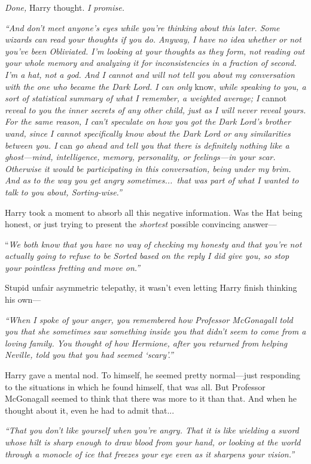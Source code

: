 \emph{Done,} Harry thought. \emph{I promise.}

\emph{“And don’t meet anyone’s eyes while you’re thinking about this later. Some wizards can read your thoughts if you do. Anyway, I have no idea whether or not you’ve been Obliviated. I’m looking at your thoughts as they form, not reading out your whole memory and analyzing it for inconsistencies in a fraction of second. I’m a hat, not a god. And I cannot and will not tell you about my conversation with the one who became the Dark Lord. I can only} know, \emph{while speaking to you, a sort of statistical summary of what I remember, a weighted average; I} cannot \emph{reveal to you the inner secrets of any other child, just as I will never reveal yours. For the same reason, I can’t speculate on how you got the Dark Lord’s brother wand, since I cannot specifically know about the Dark Lord or any similarities between you. I} can \emph{go ahead and tell you that there is definitely nothing like a ghost—mind, intelligence, memory, personality, or feelings—in your scar. Otherwise it would be participating in this conversation, being under my brim. And as to the way you get angry sometimes...\ that was part of what I wanted to talk to you about, Sorting-wise.”}

Harry took a moment to absorb all this negative information. Was the Hat being honest, or just trying to present the \emph{shortest} possible convincing answer—

“\emph{We both know that you have no way of checking my honesty and that you’re not actually going to refuse to be Sorted based on the reply I did give you, so stop your pointless fretting and move on.”}

Stupid unfair asymmetric telepathy, it wasn’t even letting Harry finish thinking his own—

\emph{“When I spoke of your anger, you remembered how Professor McGonagall told you that she sometimes saw something inside you that didn’t seem to come from a loving family. You thought of how Hermione, after you returned from helping Neville, told you that you had seemed ‘scary’.”}

Harry gave a mental nod. To himself, he seemed pretty normal—just responding to the situations in which he found himself, that was all. But Professor McGonagall seemed to think that there was more to it than that. And when he thought about it, even he had to admit that...

\emph{“That you don’t like yourself when you’re angry. That it is like wielding a sword whose hilt is sharp enough to draw blood from your hand, or looking at the world through a monocle of ice that freezes your eye even as it sharpens your vision.”}

